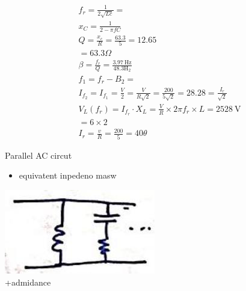 \documentclass[12pt, a4paper]{article}
\begin{document}
	$$
		\begin{aligned}
			 & f_{r}=\frac{1}{2 \sqrt{L c}}=                                                                            \\
			 & x_{C}=\frac{1}{2-\pi f C}                                                                                \\
			 & Q=\frac{x_{c}}{R}=\frac{63.3}{5}=12.65                                                                   \\
			 & =63.3 \Omega                                                                                             \\
			 & \beta=\frac{f_{r}}{Q}=\frac{3.97 \mathrm{~Hz}}{48.3 \mathrm{H}_{2}}                                      \\
			 & f_{1}=f_{r}-B_{2}=                                                                                       \\
			 & I_{f_{2}}=I_{f_{1}}=\frac{V}{2}=\frac{V}{R \sqrt{2}}=\frac{200}{5 \sqrt{2}}=28.28=\frac{I_{r}}{\sqrt{2}} \\
			 & V_{L}\left(f_{r}\right)=I_{f_{r}} \cdot X_{L}=\frac{V}{R} \times 2 \pi f_{r} \times L=2528 \mathrm{~V}   \\
			 & =6 \times 2                                                                                              \\
			 & I_{r}=\frac{v}{R}=\frac{200}{5}=40 \theta
		\end{aligned}
	$$

	Parallel AC circut

	\begin{itemize}
		\item equivatent inpedeno masw
	\end{itemize}

	\includegraphics[max width=\textwidth, center]{2024_06_15_74bbabba7981675b0d49g-10}\\
	+admidance
\end{document}
